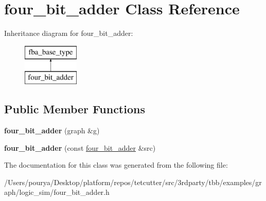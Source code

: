 \hypertarget{classfour__bit__adder}{}\section{four\+\_\+bit\+\_\+adder Class Reference}
\label{classfour__bit__adder}
Inheritance diagram for four\+\_\+bit\+\_\+adder\+:\begin{figure}[H]
\begin{center}
\leavevmode
\includegraphics[height=2.000000cm]{classfour__bit__adder}
\end{center}
\end{figure}
\subsection*{Public Member Functions}
\begin{DoxyCompactItemize}
\item 
\hypertarget{classfour__bit__adder_a3404505c86ca09ba969447db86a8c5b8}{}{\bfseries four\+\_\+bit\+\_\+adder} (graph \&g)\label{classfour__bit__adder_a3404505c86ca09ba969447db86a8c5b8}

\item 
\hypertarget{classfour__bit__adder_abeeb1f2be6f50c35eda1c59a782f6abc}{}{\bfseries four\+\_\+bit\+\_\+adder} (const \hyperlink{classfour__bit__adder}{four\+\_\+bit\+\_\+adder} \&src)\label{classfour__bit__adder_abeeb1f2be6f50c35eda1c59a782f6abc}

\end{DoxyCompactItemize}


The documentation for this class was generated from the following file\+:\begin{DoxyCompactItemize}
\item 
/\+Users/pourya/\+Desktop/platform/repos/tetcutter/src/3rdparty/tbb/examples/graph/logic\+\_\+sim/four\+\_\+bit\+\_\+adder.\+h\end{DoxyCompactItemize}
